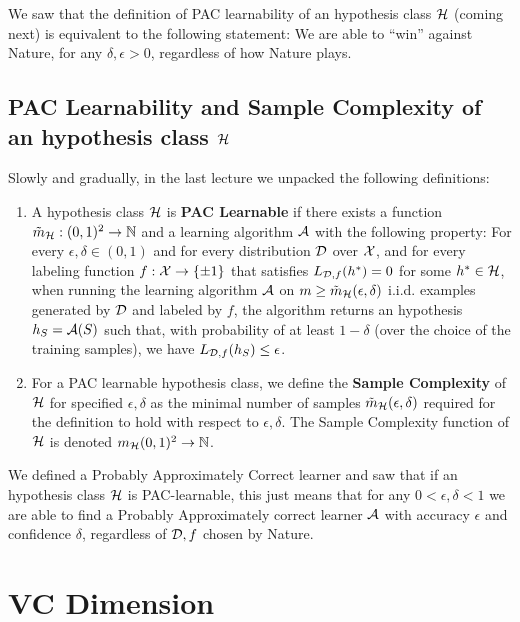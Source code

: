 We saw that the definition of PAC learnability of an hypothesis class $\mathcal{H}$
(coming next) is equivalent to the following statement: We are able to ``win''
against Nature, for any $\delta,\epsilon>0$, regardless of how Nature plays.


\subsection*{PAC Learnability and Sample Complexity of an hypothesis class $\mathcal{H}$}

Slowly and gradually, in the last lecture we unpacked the following
definitions:

\begin{definition}
\begin{enumerate}
\item
A hypothesis class $\mathcal{H}$ is {\bf PAC Learnable} if there exists a function $\tilde{m}_{\mathcal{H}} : (0,1)^2 \to \mathbb{N}$ and a learning algorithm $\mathcal{A}$ with the following property:
For every $\epsilon,\delta \in (0,1)$ and for every distribution $\mathcal{D}$ over $\mathcal{X}$, and for every labeling function 
$f:\mathcal{X}\to\{\pm 1\}$ that satisfies $L_{\mathcal{D},f}(h^*)=0$ for some $h^*\in\mathcal{H}$, when running the learning algorithm $\mathcal{A}$ on $m\ge \tilde{m}_{\mathcal{H}}(\epsilon,\delta)$ i.i.d. examples generated by $\mathcal{D}$ and labeled by $f$, the algorithm returns an hypothesis $h_S=\mathcal{A}(S)$ such that, with probability of at least $1-\delta$ (over the choice of the training samples), we have
$
L_{\mathcal{D}, f}(h_S) \le \epsilon
$. 
\item For a PAC learnable hypothesis class, we define the {\bf Sample Complexity} of $\mathcal{H}$ for specified $\epsilon,\delta$ as the minimal number of samples $\tilde{m}_{\mathcal{H}}(\epsilon,\delta)$ required for the definition to hold with respect to $\epsilon,\delta$. The Sample Complexity function of $\mathcal{H}$ is denoted $m_{\mathcal{H}}(0,1)^2\to\mathbb{N}$.
\end{enumerate}
\end{definition}

We defined a Probably Approximately Correct learner and saw that if an
hypothesis class $\mathcal{H}$ is PAC-learnable, this just means that for any $0<\epsilon,
\delta<1$ we are able to
find a Probably Approximately correct learner $\mathcal{A}$ with accuracy $\epsilon$ and
confidence $\delta$, regardless of $\mathcal{D},f$ chosen by Nature. 


\section*{VC Dimension}

